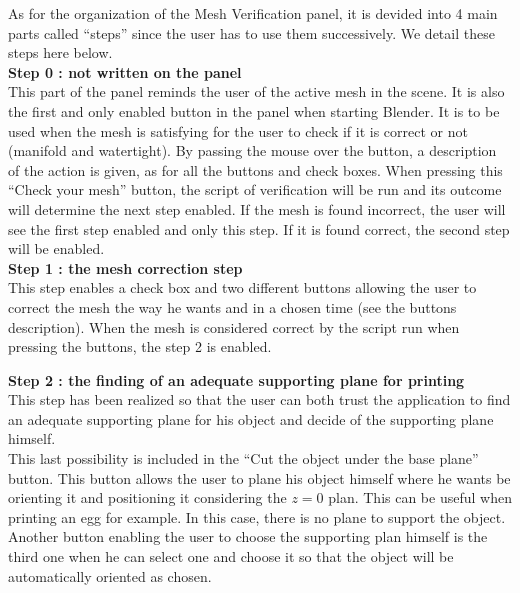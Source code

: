 \documentclass{article}
\begin{document}
As for the organization of the Mesh Verification panel, it is devided into 4 main parts called ``steps'' since the user has to use them successively. We detail these steps here below.\\

\textbf{Step 0 : not written on the panel} \\

This part of the panel reminds the user of the active mesh in the scene. It is also the first and only enabled button in the panel when starting Blender. It is to be used when the mesh is satisfying for the user to check if it is correct or not (manifold and watertight). By passing the mouse over the button, a description of the action is given, as for all the buttons and check boxes. When pressing this ``Check your mesh'' button, the script of verification will be run and its outcome will determine the next step enabled. If the mesh is found incorrect, the user will see the first step enabled and only this step. If it is found correct, the second step will be enabled.\\

\textbf{Step 1 : the mesh correction step} \\

This step enables a check box and two different buttons allowing the user to correct the mesh the way he wants and in a chosen time (see the buttons description). When the mesh is considered correct by the script run when pressing the buttons, the step 2 is enabled. 

\newpage

\textbf{Step 2 : the finding of an adequate supporting plane for printing}\\

This step has been realized so that the user can both trust the application to find an adequate supporting plane for his object and decide of the supporting plane himself. \\

This last possibility is included in the ``Cut the object under the base plane'' button. This button allows the user to plane his object himself where he wants be orienting it and positioning it considering the $z = 0$ plan. This can be useful when printing an egg for example. In this case, there is no plane to support the object. Another button enabling the user to choose the supporting plan himself is the third one when he can select one and choose it so that the object will be automatically oriented as chosen.\\
\end{document}
